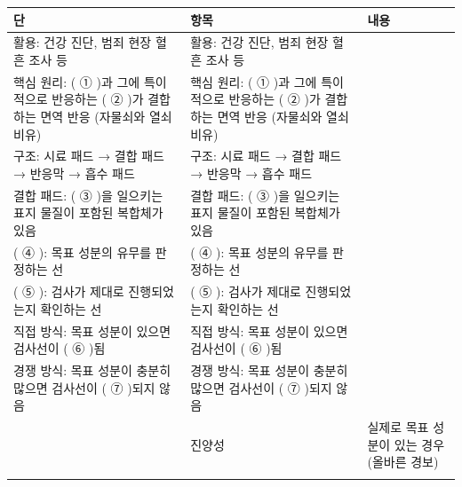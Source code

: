 \documentclass[fs9,seriesRus]{korfarm-base}
\begin{document}
\kfActivityBg \par{}\par\nopagebreak[4]\smallskip\nopagebreak[4]
\par\medskip{}
\begin{tcolorbox}[enhanced, breakable=true,
  colback=kfPaper, colframe=kfRule, boxrule=0.4pt, arc=2pt,
  left=8pt, right=8pt, top=6pt, bottom=6pt,
  title={\footnotesize\bfseries\color{kfMute} 글의 구조도},
  coltitle=kfMute, colbacktitle=kfPrimaryLight!40,
  attach boxed title to top left={yshift=-1.5mm, xshift=6pt},
  boxed title style={colframe=kfRule, boxrule=0.3pt, arc=1pt}]
\footnotesize{}
\renewcommand{\arraystretch}{1.35}
\noindent\begin{tabularx}{\linewidth}{|>{\centering\arraybackslash}p{1.6cm}|>{\raggedright\arraybackslash}p{3.4cm}|>{\raggedright\arraybackslash}X|}
\hline
\rowcolor{kfPrimaryLight!40}\textbf{\color{kfPrimary}단} & \textbf{\color{kfPrimary}항목} & \textbf{\color{kfPrimary}내용} \\\hline
활용: 건강 진단, 범죄 현장 혈흔 조사 등 & 활용: 건강 진단, 범죄 현장 혈흔 조사 등 &  \\\hline
핵심 원리: ( ① )과 그에 특이적으로 반응하는 ( ② )가 결합하는 면역 반응 (자물쇠와 열쇠 비유) & 핵심 원리: ( ① )과 그에 특이적으로 반응하는 ( ② )가 결합하는 면역 반응 (자물쇠와 열쇠 비유) &  \\\hline
구조: 시료 패드 → 결합 패드 → 반응막 → 흡수 패드 & 구조: 시료 패드 → 결합 패드 → 반응막 → 흡수 패드 &  \\\hline
결합 패드: ( ③ )을 일으키는 표지 물질이 포함된 복합체가 있음 & 결합 패드: ( ③ )을 일으키는 표지 물질이 포함된 복합체가 있음 &  \\\hline
( ④ ): 목표 성분의 유무를 판정하는 선 & ( ④ ): 목표 성분의 유무를 판정하는 선 &  \\\hline
( ⑤ ): 검사가 제대로 진행되었는지 확인하는 선 & ( ⑤ ): 검사가 제대로 진행되었는지 확인하는 선 &  \\\hline
직접 방식: 목표 성분이 있으면 검사선이 ( ⑥ )됨 & 직접 방식: 목표 성분이 있으면 검사선이 ( ⑥ )됨 &  \\\hline
경쟁 방식: 목표 성분이 충분히 많으면 검사선이 ( ⑦ )되지 않음 & 경쟁 방식: 목표 성분이 충분히 많으면 검사선이 ( ⑦ )되지 않음 &  \\\hline
\multirow{2}{*}{( ⑧ ): 키트가 목표 성분이 있다고 판정} & 진양성 & 실제로 목표 성분이 있는 경우 (올바른 경보) \\\cline{2-3}

\end{tabularx}
\end{tcolorbox}
\end{document}
